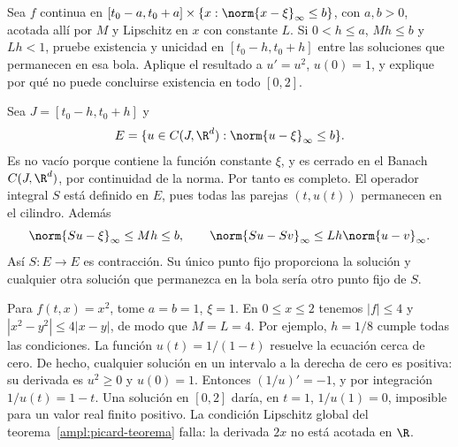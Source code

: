 \begin{ejercicio}\label{ej:ampl-picard-4}
Sea $f$ continua en $[t_0-a,t_0+a]\times\{x:\norm{x-\xi}_\infty\le b\}$, con $a,b>0$, acotada allí por $M$ y Lipschitz en $x$ con constante $L$. Si $0<h\le a$, $Mh\le b$ y $Lh<1$, pruebe existencia y unicidad en $[t_0-h,t_0+h]$ entre las soluciones que permanecen en esa bola. Aplique el resultado a $u'=u^2$, $u(0)=1$, y explique por qué no puede concluirse existencia en todo $[0,2]$.
\end{ejercicio}
\begin{solucion}
Sea $J=[t_0-h,t_0+h]$ y
\[
 E=\{u\in C(J,\R^d):\norm{u-\xi}_\infty\le b\}.
\]
Es no vacío porque contiene la función constante $\xi$, y es cerrado en el Banach $C(J,\R^d)$, por continuidad de la norma. Por tanto es completo. El operador integral $S$ está definido en $E$, pues todas las parejas $(t,u(t))$ permanecen en el cilindro. Además
\[
 \norm{Su-\xi}_\infty\le Mh\le b,\qquad
 \norm{Su-Sv}_\infty\le Lh\norm{u-v}_\infty.
\]
Así $S:E\to E$ es contracción. Su único punto fijo proporciona la solución y cualquier otra solución que permanezca en la bola sería otro punto fijo de $S$.

Para $f(t,x)=x^2$, tome $a=b=1$, $\xi=1$. En $0\le x\le2$ tenemos $|f|\le4$ y $|x^2-y^2|\le4|x-y|$, de modo que $M=L=4$. Por ejemplo, $h=1/8$ cumple todas las condiciones. La función $u(t)=1/(1-t)$ resuelve la ecuación cerca de cero. De hecho, cualquier solución en un intervalo a la derecha de cero es positiva: su derivada es $u^2\ge0$ y $u(0)=1$. Entonces $(1/u)'=-1$, y por integración $1/u(t)=1-t$. Una solución en $[0,2]$ daría, en $t=1$, $1/u(1)=0$, imposible para un valor real finito positivo. La condición Lipschitz global del teorema~\ref{ampl:picard-teorema} falla: la derivada $2x$ no está acotada en $\R$.
\end{solucion}

